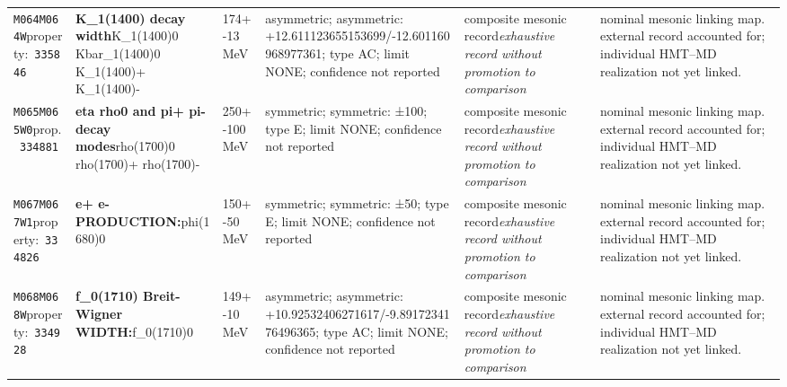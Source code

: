 \begin{landscape}
\begin{longtable}{L{1.85cm}L{4.45cm}L{2.35cm}L{4.05cm}L{3.35cm}L{7.15cm}}
\texttt{M064}\newline \texttt{M064W}\newline property:\ \texttt{335846} & \textbf{K\_\allowbreak{}1(1400) decay width}\newline K\_\allowbreak{}1(1400)0 \textbar{}\allowbreak{} Kbar\_\allowbreak{}1(1400)0 \textbar{}\allowbreak{} K\_\allowbreak{}1(1400)+ \textbar{}\allowbreak{} K\_\allowbreak{}1(1400)- & 174+-13\,MeV & asymmetric; asymmetric: +12.611123655153699/-12.601160968977361; type AC; limit NONE; confidence not reported & composite mesonic record\newline \emph{exhaustive record without promotion to comparison} & nominal mesonic linking map. external record accounted for; individual HMT--MD realization not yet linked. \\
\texttt{M065}\newline \texttt{M065W0}\newline prop.\ \texttt{334881} & \textbf{eta rho0 and pi+ pi- decay modes}\newline rho(1700)0 \textbar{}\allowbreak{} rho(1700)+ \textbar{}\allowbreak{} rho(1700)- & 250+-100\,MeV & symmetric; symmetric: ±100; type E; limit NONE; confidence not reported & composite mesonic record\newline \emph{exhaustive record without promotion to comparison} & nominal mesonic linking map. external record accounted for; individual HMT--MD realization not yet linked. \\
\texttt{M067}\newline \texttt{M067W1}\newline property:\ \texttt{334826} & \textbf{e+ e- PRODUCTION:}\newline phi(1680)0 & 150+-50\,MeV & symmetric; symmetric: ±50; type E; limit NONE; confidence not reported & composite mesonic record\newline \emph{exhaustive record without promotion to comparison} & nominal mesonic linking map. external record accounted for; individual HMT--MD realization not yet linked. \\
\texttt{M068}\newline \texttt{M068W}\newline property:\ \texttt{334928} & \textbf{f\_\allowbreak{}0(1710) Breit-Wigner WIDTH:}\newline f\_\allowbreak{}0(1710)0 & 149+-10\,MeV & asymmetric; asymmetric: +10.92532406271617/-9.8917234176496365; type AC; limit NONE; confidence not reported & composite mesonic record\newline \emph{exhaustive record without promotion to comparison} & nominal mesonic linking map. external record accounted for; individual HMT--MD realization not yet linked. \\

\end{longtable}
\end{landscape}
